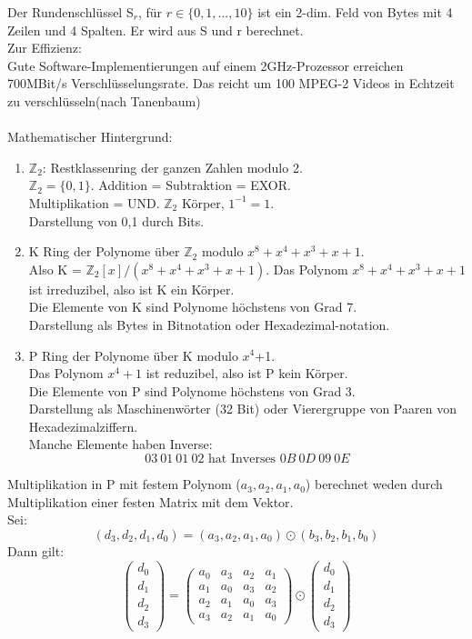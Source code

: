 \documentclass[a4paper,12pt]{article}
\begin{document}
Der Rundenschlüssel S$_r$, für $r\in\{0,1,\dots,10\}$ ist ein 2-dim. Feld von Bytes mit 4 Zeilen und 4 Spalten. Er wird aus S und r berechnet.\\
Zur Effizienz:\\
\glqq{}Gute Software-Implementierungen auf einem 2GHz-Prozessor erreichen 700MBit/s Verschlüsselungsrate. Das reicht um 100 MPEG-2 Videos in Echtzeit zu verschlüsseln\grqq{}(nach Tanenbaum)\\
\\
Mathematischer Hintergrund:
\begin{enumerate}
  \item	$\mathbb{Z}_2$: Restklassenring der ganzen Zahlen modulo 2.\\
	$\mathbb{Z}_2 = \{0,1\}$. Addition = Subtraktion = EXOR.\\
	Multiplikation = UND. $\mathbb{Z}_2$ Körper, $1^{-1}=1.$\\
	Darstellung von 0,1 durch Bits.
  \item	K Ring der Polynome über $\mathbb{Z}_2$ modulo $x^8+x^4+x^3+x+1$.\\
	Also K = $\mathbb{Z}_2[x]/(x^8+x^4+x^3+x+1)$. Das Polynom $x^8+x^4+x^3+x+1$ ist irreduzibel, also ist K ein Körper.\\
	Die Elemente von K sind Polynome höchstens von Grad 7.\\
	Darstellung als Bytes in Bitnotation oder Hexadezimal-notation.
  \item P Ring der Polynome über K modulo $x^4$+1.\\
	Das Polynom $x^4+1$ ist reduzibel, also ist P kein Körper.\\
	Die Elemente von P sind Polynome höchstens von Grad 3.\\
	Darstellung als Maschinenwörter (32 Bit) oder  Vierergruppe von Paaren von Hexadezimalziffern.\\
	Manche Elemente haben Inverse:
	$$03\:01\:01\:02\text{ hat Inverses }0B\:0D\:09\:0E$$
\end{enumerate}
	Multiplikation in P mit festem Polynom ($a_3,a_2,a_1,a_0$) berechnet weden durch Multiplikation einer festen Matrix mit dem Vektor.\\
	Sei:
	$$(d_3,d_2,d_1,d_0)=(a_3,a_2,a_1,a_0)\odot(b_3,b_2,b_1,b_0)$$
	Dann gilt:
	$$
	  \begin{pmatrix}
	    d_{0}\\
	    d_{1}\\
	    d_{2}\\
	    d_{3}
	  \end{pmatrix}
	  =
	  \begin{pmatrix}
	    a_{0} & a_{3} & a_2 & a_{1} \\
	    a_{1} & a_{0} & a_3 & a_{2} \\
	    a_{2}  & a_1  & a_0 & a_3  \\
	    a_{3} & a_{2} & a_1 & a_{0}
	  \end{pmatrix}
	  \odot
	  \begin{pmatrix}
	    d_{0}\\
	    d_{1}\\
	    d_{2}\\
	    d_{3}
	  \end{pmatrix}
	  $$
\end{document}
